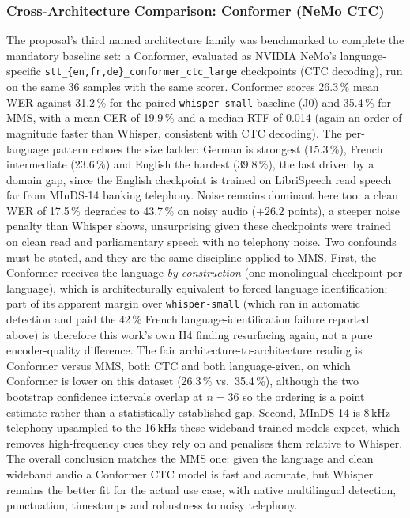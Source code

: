 \documentclass[12pt]{report}
\begin{document}
\subsubsection{Cross-Architecture Comparison: Conformer (NeMo CTC)}
The proposal's third named architecture family was benchmarked to complete the mandatory baseline set: a Conformer, evaluated as NVIDIA NeMo's language-specific \texttt{stt\_\{en,fr,de\}\_conformer\_ctc\_large} checkpoints (CTC decoding), run on the same 36 samples with the same scorer. Conformer scores 26.3\,\% mean WER against 31.2\,\% for the paired \texttt{whisper-small} baseline (J0) and 35.4\,\% for MMS, with a mean CER of 19.9\,\% and a median RTF of 0.014 (again an order of magnitude faster than Whisper, consistent with CTC decoding). The per-language pattern echoes the size ladder: German is strongest (15.3\,\%), French intermediate (23.6\,\%) and English the hardest (39.8\,\%), the last driven by a domain gap, since the English checkpoint is trained on LibriSpeech read speech far from MInDS-14 banking telephony. Noise remains dominant here too: a clean WER of 17.5\,\% degrades to 43.7\,\% on noisy audio ($+26.2$ points), a steeper noise penalty than Whisper shows, unsurprising given these checkpoints were trained on clean read and parliamentary speech with no telephony noise.
Two confounds must be stated, and they are the same discipline applied to MMS. First, the Conformer receives the language \emph{by construction} (one monolingual checkpoint per language), which is architecturally equivalent to forced language identification; part of its apparent margin over \texttt{whisper-small} (which ran in automatic detection and paid the 42\,\% French language-identification failure reported above) is therefore this work's own H4 finding resurfacing again, not a pure encoder-quality difference. The fair architecture-to-architecture reading is Conformer versus MMS, both CTC and both language-given, on which Conformer is lower on this dataset (26.3\,\% vs.\ 35.4\,\%), although the two bootstrap confidence intervals overlap at $n=36$ so the ordering is a point estimate rather than a statistically established gap. Second, MInDS-14 is 8\,kHz telephony upsampled to the 16\,kHz these wideband-trained models expect, which removes high-frequency cues they rely on and penalises them relative to Whisper. The overall conclusion matches the MMS one: given the language and clean wideband audio a Conformer CTC model is fast and accurate, but Whisper remains the better fit for the actual use case, with native multilingual detection, punctuation, timestamps and robustness to noisy telephony.
\end{document}
